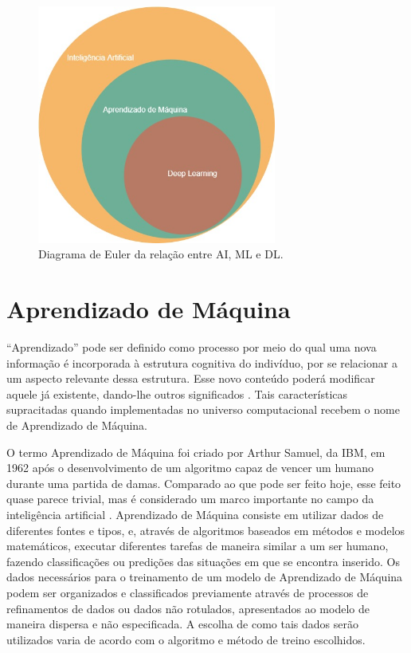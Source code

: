 \begin{figure}[htb]
  \centering
  \caption{\label{fig_euler}Diagrama de Euler da rela{\c c}{\~a}o entre AI, ML e DL.}
  \includegraphics[width=0.7\textwidth]{images/ai-euler.jpg}
\end{figure}

\section{Aprendizado de M{\'a}quina}

``Aprendizado'' pode ser definido como processo por meio do qual uma
nova informação é incorporada à estrutura cognitiva do indivíduo, por
se relacionar a um aspecto relevante dessa estrutura. Esse novo
conteúdo poderá modificar aquele já existente, dando-lhe outros
significados \cite{michaelis2022}. Tais características supracitadas
quando implementadas no universo computacional recebem o nome de
Aprendizado de Máquina.

O termo Aprendizado de Máquina foi criado por Arthur Samuel, da IBM,
em 1962 após o desenvolvimento de um algoritmo capaz de vencer um
humano durante uma partida de damas. Comparado ao que pode ser feito
hoje, esse feito quase parece trivial, mas é considerado um marco
importante no campo da inteligência artificial \cite{ibm2022}.
Aprendizado de Máquina consiste em utilizar dados de diferentes fontes
e tipos, e, através de algoritmos baseados em métodos e modelos
matemáticos, executar diferentes tarefas de maneira similar a um ser
humano, fazendo classificações ou predições das situações em que se
encontra inserido.  Os dados necessários para o treinamento de um
modelo de Aprendizado de Máquina podem ser organizados e classificados
previamente através de processos de refinamentos de dados ou dados não
rotulados, apresentados ao modelo de maneira dispersa e não
especificada. A escolha de como tais dados serão utilizados varia de
acordo com o algoritmo e método de treino escolhidos.

